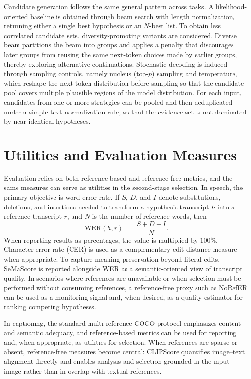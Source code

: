 Candidate generation follows the same general pattern across tasks. A likelihood-oriented baseline is obtained through beam search with length normalization, returning either a single best hypothesis or an \(N\)-best list. To obtain less correlated candidate sets, diversity-promoting variants are considered. Diverse beam partitions the beam into groups and applies a penalty that discourages later groups from reusing the same next-token choices made by earlier groups, thereby exploring alternative continuations. Stochastic decoding is induced through sampling controls, namely nucleus (top-\(p\)) sampling and temperature, which reshape the next-token distribution before sampling so that the candidate pool covers multiple plausible regions of the model distribution. For each input, candidates from one or more strategies can be pooled and then deduplicated under a simple text normalization rule, so that the evidence set is not dominated by near-identical hypotheses.

\section{Utilities and Evaluation Measures}

Evaluation relies on both reference-based and reference-free metrics, and the same measures can serve as utilities in the second-stage selection. In speech, the primary objective is word error rate. If \(S\), \(D\), and \(I\) denote substitutions, deletions, and insertions needed to transform a hypothesis transcript \(h\) into a reference transcript \(r\), and \(N\) is the number of reference words, then
\begin{equation}
\mathrm{WER}(h,r) \;=\; \frac{S + D + I}{N}.
\end{equation}
When reporting results as percentages, the value is multiplied by \(100\%\). Character error rate (CER) is used as a complementary edit-distance measure when appropriate. To capture meaning preservation beyond literal edits, SeMaScore is reported alongside WER as a semantic-oriented view of transcript quality. In scenarios where references are unavailable or when selection must be performed without consuming references, a reference-free proxy such as NoRefER can be used as a monitoring signal and, when desired, as a quality estimator for ranking competing hypotheses.

In captioning, the standard multi-reference COCO protocol emphasizes content and semantic adequacy, and reference-based metrics can be used for reporting and, when appropriate, as utilities for selection. When references are sparse or absent, reference-free measures become central: CLIPScore quantifies image--text alignment directly and enables analysis and selection grounded in the input image rather than in overlap with textual references.

